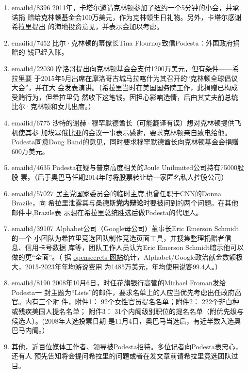 \begin{enumerate}
\item emailid/8396 2011年，卡塔尔邀请克林顿参加了纽约一个5分钟的小会，并承诺捐
  赠给克林顿基金会100万美元，作为克林顿生日礼物。另外，卡塔尔感谢希拉里提出
  的海地投资意见，并表示会加以考虑。

\item emailid/7452 比尔·克林顿的幕僚长Tina Flournoy致信Podesta：外国政府捐赠的
  钱已经入账。

\item emailid/22030 摩洛哥提出向克林顿基金会支付1200万美元，但有条件——希拉里要
  于2015年5月出席在摩洛哥古城马拉喀什为其召开的“克林顿全球倡议大会”，并在大
  会发表演讲。（希拉里当时在美国国务院工作，此捐赠已构成受贿行为，但希拉里仍
  然收下这笔钱。因担心影响选情，后由其丈夫前总统比尔·克林顿和女儿出席。）

\item emailid/6775 沙特的谢赫·穆罕默德酋长（可能翻译有误）想对克林顿提供飞机使其参
  加埃塞俄比亚的会议一事表示感谢，要求克林顿亲自致电给他。Podesta同意Doug
  Band的意见，同时要求穆罕默德酋长向克林顿基金会捐赠600万美元。

\item emailid/4635 Podesta在疑与普京高度相关的Joule Unilimited公司持有75000股股
  票。（后于奥巴马任期2014年时将股票转让给一家匿名私人控股公司）

\item emailid/57027 民主党国家委员会的临时主席,也曾任职于CNN的Donna Brazile，向
  希拉里泄露其与桑德斯\textbf{党内辩论}时要被问到的两个问题。在其他邮件中,Brazile表
  示想在希拉里总统胜选后做Podesta的代理人。

\item emailid/39107 Alphabet公司（Google母公司）董事长Eric Emerson Schmidt的一个
  小团队为希拉里竞选团队制作竞选页面工具，并搜集整理捐赠者信息、信用卡号数据
  库等，团队工作人员认为Eric Emerson Schmidt暗示他可以做的更“全面”。（
  据
  \href{https://www.opensecrets.org/federal-lobbying/clients/summary?cycle=2019&id=D000067823}{opensecrets
    网站}统计，Alphabet/Google政治献金数额极大，2015-2023年年均游说费用
  为1485万美元，年均使用说客99.4人。）

\item emailid/8190 2008年10月6日，时任花旗银行高管的Michael Froman发给Podesta一
  封主题为“Lists”的邮件，要求名单上的人应当优先考虑出任政府高官。内有三个附
  件，附件1： 92个女性官员提名名单；附件2： 222个非白种或残疾美国人提名名单；
  附件3： 31个内阁级别职位的提名名单（附优先级与候选人）。(2008年大选投票日期
  是11月4日，奥巴马当选后，有近半数入选奥巴马内阁。）

\item 其他，近百位媒体工作者、领导被Podesta招待。多位记者向Podesta表忠心，还有人
  预先告知将会提问希拉里的问题或者在发文章前请希拉里竞选团队过目。
\end{enumerate}


